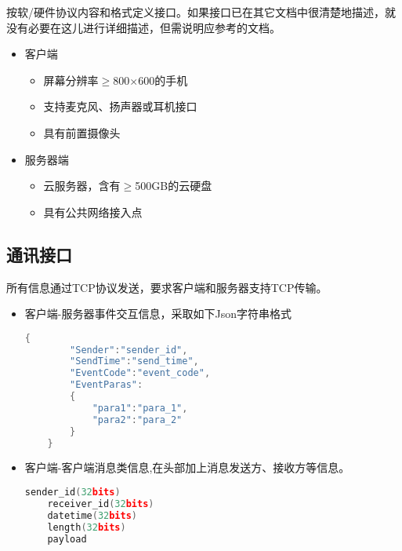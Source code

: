 按软/硬件协议内容和格式定义接口。如果接口已在其它文档中很清楚地描述，就没有必要在这儿进行详细描述，但需说明应参考的文档。
\fi
\begin{itemize}
	\item 客户端
	\begin{itemize}
		\item 屏幕分辨率$\ge$800$\times$600的手机
		\item 支持麦克风、扬声器或耳机接口
		\item 具有前置摄像头
	\end{itemize}
	\item 服务器端
	\begin{itemize}
		\item 云服务器，含有$\ge$500GB的云硬盘
		\item 具有公共网络接入点
	\end{itemize}
\end{itemize}
\subsection{通讯接口}
\iffalse
<This should specify the various interfaces to communications such as local network protocols, etc.>

详细描述通讯接口，如本地网络协议等。

Defines the interfaces according to the content and format of the message/function. If the interfaces have been clearly described in other documents, it is not necessary to describe in detail here. But the reference of those documents should be given.

按消息/函数内容和格式定义接口。如果接口已在其它文档中很清楚地描述，就没有必要在这儿进行详细描述，但需说明应参考的文档。
\fi
所有信息通过TCP协议发送，要求客户端和服务器支持TCP传输。
\begin{itemize}
	\item 客户端-服务器事件交互信息，采取如下Json字符串格式
    \begin{lstlisting}[language=C++]
   	{
   		"Sender":"sender_id",
   		"SendTime":"send_time",
   		"EventCode":"event_code",
   		"EventParas":
   		{
   			"para1":"para_1",
   			"para2":"para_2"
   		}
   	}
    \end{lstlisting}
    \item 客户端-客户端消息类信息,在头部加上消息发送方、接收方等信息。
    \begin{lstlisting}[language=C++]
    sender_id(32bits)
    receiver_id(32bits)
    datetime(32bits)
    length(32bits)
    payload
    \end{lstlisting}
\end{itemize}

